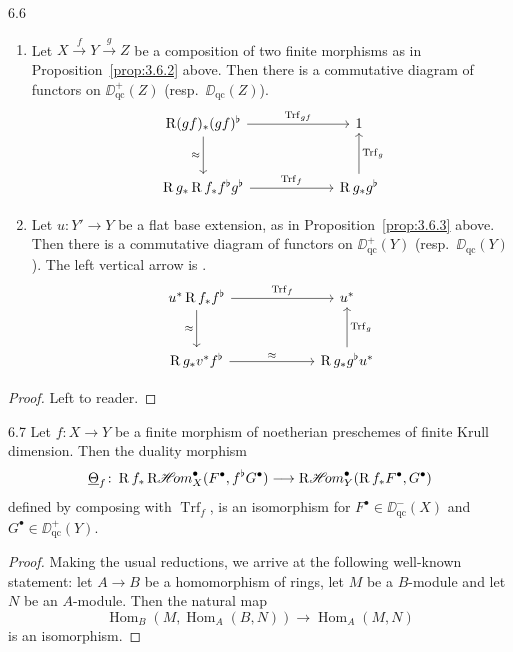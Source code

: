 \begin{bookproposition}{6.6}\label{prop:3.6.6}
\begin{enumerate}
\item Let $X\xrightarrow{f} Y\xrightarrow{g} Z$ be a composition of two finite morphisms as in Proposition~\ref{prop:3.6.2} above. Then there is a commutative diagram of functors on $\DD_{\mathrm{qc}}^+(Z)$ (resp.\ $\DD_{\mathrm{qc}}(Z)$).
\[
\begin{tikzcd}[row sep=large, column sep=6em]
	\RR (gf)_* (gf)^\flat
	\arrow[r, "{\operatorname{Trf}_{gf}}"]
	\arrow[d, "\approx"']
	& 1 \\
	\RR g_* \RR f_* f^\flat g^\flat
	\arrow[r, "{\operatorname{Trf}_f}"]
	& \RR g_* g^\flat \arrow[u, "{\operatorname{Trf}_g}"']
\end{tikzcd}
\]
\item Let $u\colon Y'\to Y$ be a flat base extension, as in Proposition~\ref{prop:3.6.3} above. Then there is a commutative diagram of functors on $\DD_{\mathrm{qc}}^+(Y)$ (resp.\ $\DD_{\mathrm{qc}}(Y)$). The left vertical arrow is .
\[
\begin{tikzcd}[row sep=large, column sep=6em]
	u^* \RR f_* f^\flat
	\arrow[r, "{\operatorname{Trf}_f}"]
	\arrow[d, "\approx"']
	& u^* \\
	\RR g_* v^* f^\flat
	\arrow[r, "\approx"]
	& \RR g_* g^\flat u^* \arrow[u, "{\operatorname{Trf}_g}"']
\end{tikzcd}
\]
\end{enumerate}
\end{bookproposition}

\begin{proof}
Left to reader.
\end{proof}

\begin{booktheorem}[Duality]{6.7}\label{thm:3.6.7}
Let $f\colon X\to Y$ be a finite morphism of noetherian preschemes of finite Krull dimension. Then the duality morphism
\[
\underline{\Theta}_f\colon \operatorname{R} f_* \mathop{\mathrm{R}\mathscr{H}\!om}\nolimits_X^\bullet(F^\bullet, f^{\flat}G^\bullet) \longrightarrow \mathop{\mathrm{R}\mathscr{H}\!om}\nolimits_Y^\bullet(\operatorname{R} f_*F^\bullet, G^\bullet)
\]
defined by composing  with $\operatorname{Trf}_f$, is an isomorphism for $F^\bullet\in\DD_{\mathrm{qc}}^-(X)$ and $G^\bullet\in\DD_{\mathrm{qc}}^+(Y)$.
\end{booktheorem}

\begin{proof}
Making the usual reductions, we arrive at the following well-known statement: let $A\to B$ be a homomorphism of rings, let $M$ be a $B$-module and let $N$ be an $A$-module. Then the natural map
\[
\operatorname{Hom}_B(M, \operatorname{Hom}_A(B,N)) \longrightarrow \operatorname{Hom}_A(M,N)
\]
is an isomorphism.
\end{proof}

